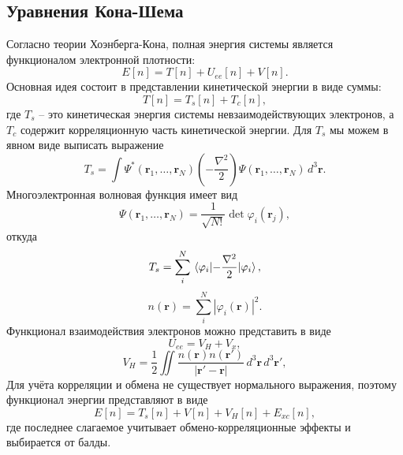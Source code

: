\documentclass[11pt,russian]{ncc}
\renewcommand{\phi}{\varphi}
\renewcommand{\vec}{\boldsymbol}
\begin{document}
    \subsection{Уравнения Кона-Шема}
    Согласно теории Хоэнберга-Кона, полная энергия системы является функционалом электронной плотности:
    \begin{equation}
        E[n] = T[n] + U_{ee}[n] + V[n].
    \end{equation}
    Основная идея состоит в представлении кинетической энергии в виде суммы:
    \begin{equation}
        T[n] = T_s[n] + T_c[n],
    \end{equation}
    где \( T_s \) -- это кинетическая энергия системы невзаимодействующих электронов, а \( T_c \) содержит корреляционную часть кинетической энергии. Для \( T_s \) мы можем в явном виде выписать выражение
    \begin{equation}
        T_s = \int \Psi^*(\vec{r}_1, \ldots, \vec{r}_N) \left(-\frac{\nabla^2}{2}\right) \Psi(\vec{r}_1, \ldots, \vec{r}_N)\,d^3\vec{r}.
    \end{equation}
    Многоэлектронная волновая функция имеет вид
    \begin{equation}
        \Psi(\vec{r}_1, \ldots, \vec{r}_N) = \frac{1}{\sqrt{N!}}\det \phi_i(\vec{r}_j),
    \end{equation}
    откуда
    \begin{equation}
        T_s = \sum_{i}^N\expval{-\frac{\nabla^2}{2}}{\phi_i},
    \end{equation}
    \begin{equation}
        n(\vec{r}) = \sum_{i}^N|\phi_i(\vec{r})|^2.
    \end{equation}
    Функционал взаимодействия электронов можно представить в виде
    \begin{equation}
        U_{ee} = V_H + V_x,
    \end{equation}
    \begin{equation}
        V_H = \frac{1}{2}\iint \frac{n(\vec{r})n(\vec{r}')}{|\vec{r}' - \vec{r}|}\,d^3\vec{r}\,d^3\vec{r}',
    \end{equation}
    Для учёта корреляции и обмена не существует нормального выражения, поэтому функционал энергии представляют в виде
    \begin{equation}
        E[n] = T_s[n] + V[n] + V_H[n] + E_{xc}[n],
    \end{equation}
    где последнее слагаемое учитывает обмено-корреляционные эффекты и выбирается от балды.
\end{document}
